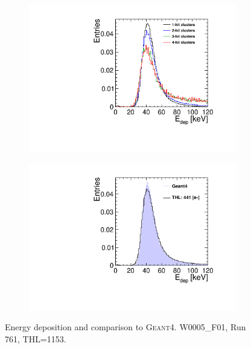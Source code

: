 \begin{figure}[htbp] \centering
  \begin{subfigure}[b]{0.45\textwidth}
    \includegraphics[width=\textwidth]{./figures/Calibration/Edep_Clusters_W0005_F01.pdf}
    \caption{}
  \end{subfigure}\hfill
  \begin{subfigure}[b]{0.45\textwidth}
    \includegraphics[width=\textwidth]{./figures/Calibration/Edep_G4_W0005_F01.pdf}
    \caption{}
  \end{subfigure}
  \caption{Energy deposition and comparison to
    \textsc{Geant4}. W0005\_F01, Run 761, THL=1153.}
  \label{fig:EdepW19L8}
\end{figure}

